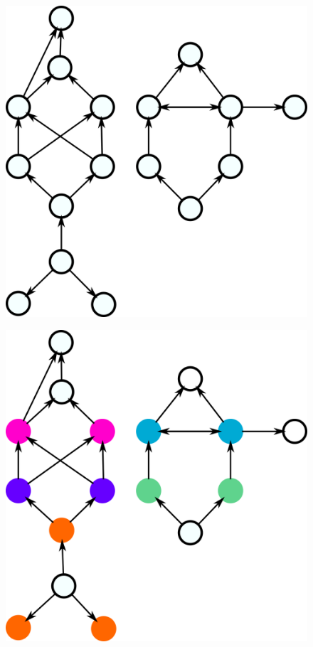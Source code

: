 \documentclass[12pt]{diazessay} %
\begin{document}
\begin{figure}[h]
	\centering
	\includegraphics[scale=0.3]{Figures/result1.png}
\end{figure}
\begin{figure}[h]
	\centering
	\includegraphics[scale=0.3]{Figures/result1-1.png}
\end{figure}
\end{document}
